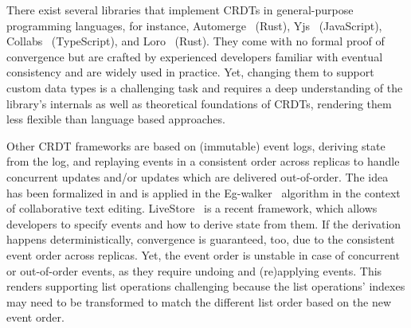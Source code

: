 There exist several libraries that implement \acp{CRDT} in general-purpose
programming languages, for instance, Automerge~\cite{automerge} (Rust),
Yjs~\cite{yjs} (JavaScript), Collabs~\cite{collabs} (TypeScript),
and Loro~\cite{loro} (Rust).
They come with no formal proof of convergence but are crafted by experienced
developers familiar with eventual consistency and are widely used in practice.
Yet, changing them to support custom data types is a challenging task and
requires a deep understanding of the library's internals as well as theoretical
foundations of \acp{CRDT}, rendering them less flexible than language based
approaches.

Other \ac{CRDT} frameworks are based on (immutable) event logs, deriving state
from the log, and replaying events in a consistent order across replicas to
handle concurrent updates and/or updates which are delivered out-of-order.
The idea has been formalized in \cite{baquero2017pure} and is applied in
the Eg-walker~\cite{egwalker} algorithm in the context of collaborative text
editing.
LiveStore~\cite{livestore} is a recent framework, which allows developers
to specify events and how to derive state from them.
If the derivation happens deterministically, convergence is guaranteed, too,
due to the consistent event order across replicas.
Yet, the event order is unstable in case of concurrent or out-of-order events,
as they require undoing and (re)applying events.
This renders supporting list operations challenging because the list operations'
indexes may need to be transformed to match the different list order based on
the new event order.

